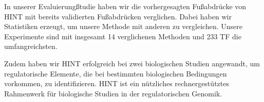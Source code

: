 In unserer Evaluierung{\ss}tudie haben wir die vorhergesagten Fu{\ss}abdr{\"u}cke von HINT mit bereits validierten Fu{\ss}abdr{\"u}cken verglichen. Dabei haben wir Statistiken erzeugt, um unsere Methode mit anderen zu vergleichen. Unsere Experimente sind mit insgesamt 14 verglichenen Methoden und 233 TF die umfangreichsten. 

Zudem haben wir HINT erfolgreich bei zwei biologischen Studien angewandt, um regulatorische Elemente, die bei bestimmten biologischen Bedingungen vorkommen, zu identifizieren. HINT ist ein n{\"u}tzliches rechnergest{\"u}tztes Rahmenwerk f{\"u}r biologische Studien in der regulatorischen Genomik.


